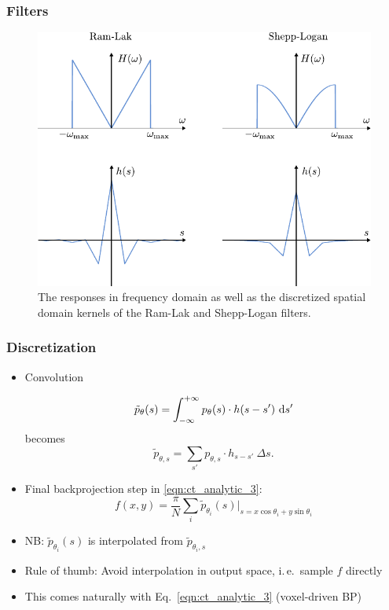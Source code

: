 \begin{frame}
	\frametitle{Filters}

	\begin{figure}[tbp]
		\centering
		\includegraphics[width=0.5\linewidth]{images/analytic_2}
		\caption{The responses in frequency domain as well as the discretized spatial domain kernels of the Ram-Lak and Shepp-Logan filters.}
	\end{figure}

\end{frame}

\begin{frame}
	\frametitle{Discretization}

	\begin{itemize}
		\item Convolution


		      \begin{equation}
			      \tilde{p}_{\theta}(s) = \int_{-\infty}^{+\infty} p_\theta(s) \cdot h(s - s') \ \textnormal d s'
		      \end{equation}
		      becomes
		      \begin{equation}
			      \tilde{p}_{\theta, s} = \sum_{s'} p_{\theta, s} \cdot h_{s - s'}\ \Delta s.
		      \end{equation}

		\item Final backprojection step in \eqref{eqn:ct_analytic_3}:
		      \begin{equation}
			      \label{eqn:ct_analytic_3}
			      f(x, y) = \frac{\pi}{N} \sum_i \tilde{p}_{\theta_i}(s) |_{s=x \cos \theta_i + y \sin \theta_i}
		      \end{equation}

		\item NB: $\tilde{p}_{\theta_i}(s)$ is interpolated from $\tilde{p}_{\theta_i, s}$
		\item Rule of thumb: Avoid interpolation in output space, i.\,e.~sample $f$ directly
		\item This comes naturally with Eq.~\ref{eqn:ct_analytic_3} (voxel-driven BP)

	\end{itemize}

\end{frame}

